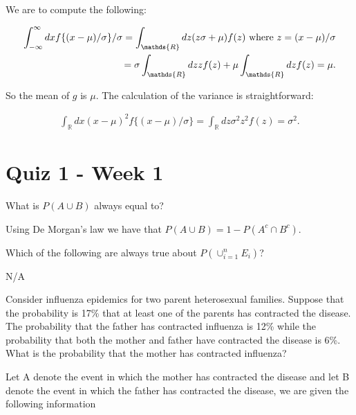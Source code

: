 \documentclass{homework}
\begin{document}
We are to compute the following:

\begin{align*}
    \int_{-\infty}^{\infty} dx f\{ (x - \mu) / \sigma \} / \sigma = \int_{\mathds{R}} dz (z\sigma+\mu)f(z) \textnormal{ where } z=(x-\mu) / \sigma  \\
    = \sigma  \int_{\mathds{R}} dz z f(z) + \mu  \int_{\mathds{R}} dz f(z) = \mu.
\end{align*}

So the mean of $g$ is $\mu$. The calculation of the variance is straightforward:

\begin{align*}
    \int_{\mathds{R}} dx (x-\mu)^2f\{ (x - \mu) / \sigma \} = \int_{\mathds{R}} dz \sigma^2 z^2f(z) = \sigma^2. 
\end{align*}

\clearpage

\section{Quiz 1 - Week 1}

\begin{tcolorbox}[title=Question 1]
What is $P(A\cup B)$ always equal to?
\end{tcolorbox}

Using De Morgan's law we have that $P(A\cup B) = 1 - P(A^c \cap B^c).$\\

\begin{tcolorbox}[title=Question 2]
Which of the following are always true about $P(\cup_{i=1}^n E_i)$?
\end{tcolorbox}

N/A\\

\begin{tcolorbox}[title=Question 3]
Consider influenza epidemics for two parent heterosexual families. Suppose that the probability is 17\% that at least one of the parents has contracted the disease. The probability that the father has contracted influenza is 12\% while the probability that both the mother and father have contracted the disease is 6\%. What is the probability that the mother has contracted influenza?
\end{tcolorbox}

Let A denote the event in which the mother has contracted the disease and let B denote the event in which the father has contracted the disease, we are given the following information
\end{document}

